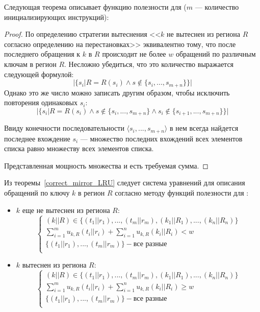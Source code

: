 Следующая теорема описывает функцию полезности для \LRU ($m$ --- количество
инициализирующих инструкций):

\begin{theorem}\label{correct_mirror_LRU} \LRUusefuls
\end{theorem}

\begin{proof}
По определению стратегии вытеснения \LRU <<$k$ не вытеснен из региона $R$ согласно определению на перестановках>> эквивалентно тому, что после последнего обращения к $k$ в $R$ происходит не более $w$ обращений по различным ключам в регион $R$. Несложно убедиться, что это количество выражается следующей формулой: $$|\{s_i| R = R(s_i) \wedge s \notin \{s_i, ..., s_{m+n}\}\}|$$
Однако это же число можно записать другим образом, чтобы исключить повторения одинаковых $s_i$:
$$|\{s_i| R = R(s_i) \wedge s \notin \{s_i, ..., s_{m+n}\} \wedge s_i \notin \{s_{i+1}, ..., s_{m+n}\}\}|$$

Ввиду конечности последовательности $\langle s_i, ..., s_{m+n}\rangle$ в нем всегда найдется последнее вхождение $s_i$ --- множество последних вхождений всех элементов списка равно множеству всех элементов списка.

Представленная мощность множества и есть требуемая сумма.
\end{proof}

Из теоремы~\ref{correct_mirror_LRU} следует система уравнений для
описания обращений по ключу $k$ в регион $R$ согласно методу функций полезности
для \LRU: \begin{itemize}
\item $k$ еще не вытеснен из региона $R$:
$$
\left\{\begin{array}{l} (k||R) \in \{(t_1||r_1), ..., (t_m||r_m), (k_1||R_1),
..., (k_n||R_n)\}\\
\sum\limits_{i=1}^m u_{k,R}(t_i||r_i) + \sum\limits_{i=1}^n u_{k,R}(k_i||R_i) <
w\\
\{(t_1||r_1), ..., (t_m||r_m)\} - \mbox{все разные}\\
\end{array} \right.
$$
\item $k$ вытеснен из региона $R$:
$$
\left\{\begin{array}{l} (k||R) \in \{(t_1||r_1), ..., (t_m||r_m), (k_1||R_1),
..., (k_n||R_n)\}\\
\sum\limits_{i=1}^m u_{k,R}(t_i||r_i) + \sum\limits_{i=1}^n u_{k,R}(k_i||R_i)
\geqslant w\\
\{(t_1||r_1), ..., (t_m||r_m)\} - \mbox{все разные}\\
\end{array} \right.
$$
\end{itemize}


